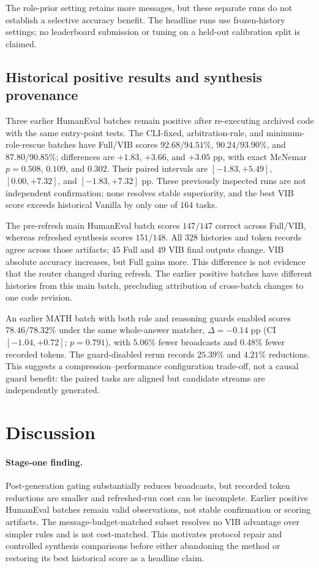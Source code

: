 \documentclass[11pt,twoside,twocolumn,letterpaper]{article}
\begin{document}
The role-prior setting retains more messages, but these separate runs do not establish a selective accuracy benefit. The headline runs use frozen-history settings; no leaderboard submission or tuning on a held-out calibration split is claimed.

\subsection{Historical positive results and synthesis provenance}
Three earlier HumanEval batches remain positive after re-executing archived code with the same entry-point tests. The CLI-fixed, arbitration-rule, and minimum-role-rescue batches have Full/VIB scores $92.68/94.51\%$, $90.24/93.90\%$, and $87.80/90.85\%$; differences are $+1.83$, $+3.66$, and $+3.05$ pp, with exact McNemar $p=0.508$, $0.109$, and $0.302$. Their paired intervals are $[-1.83,+5.49]$, $[0.00,+7.32]$, and $[-1.83,+7.32]$ pp. These previously inspected runs are not independent confirmation; none resolves stable superiority, and the best VIB score exceeds historical Vanilla by only one of $164$ tasks.

The pre-refresh main HumanEval batch scores $147/147$ correct across Full/VIB, whereas refreshed synthesis scores $151/148$. All $328$ histories and token records agree across those artifacts; $45$ Full and $49$ VIB final outputs change. VIB absolute accuracy increases, but Full gains more. This difference is not evidence that the router changed during refresh. The earlier positive batches have different histories from this main batch, precluding attribution of cross-batch changes to one code revision.

An earlier MATH batch with both role and reasoning guards enabled scores $78.46/78.32\%$ under the same whole-answer matcher, $\Delta=-0.14$ pp (CI $[-1.04,+0.72]$; $p=0.791$), with $5.06\%$ fewer broadcasts and $0.48\%$ fewer recorded tokens. The guard-disabled rerun records $25.39\%$ and $4.21\%$ reductions. This suggests a compression--performance configuration trade-off, not a causal guard benefit: the paired tasks are aligned but candidate streams are independently generated.

\section{Discussion}
\paragraph{Stage-one finding.} Post-generation gating substantially reduces broadcasts, but recorded token reductions are smaller and refreshed-run cost can be incomplete. Earlier positive HumanEval batches remain valid observations, not stable confirmation or scoring artifacts. The message-budget-matched subset resolves no VIB advantage over simpler rules and is not cost-matched. This motivates protocol repair and controlled synthesis comparisons before either abandoning the method or restoring its best historical score as a headline claim.
\end{document}
